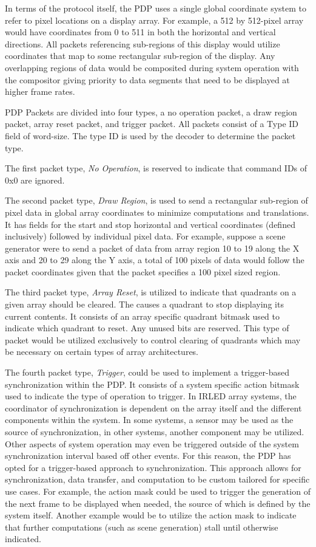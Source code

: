     In terms of the protocol itself, the PDP uses a single global coordinate system to refer to pixel locations on a display array. For example, a 512 by 512-pixel array would have coordinates from 0 to 511 in both the horizontal and vertical directions. All packets referencing sub-regions of this display would utilize coordinates that map to some rectangular sub-region of the display. Any overlapping regions of data would be composited during system operation with the compositor giving priority to data segments that need to be displayed at higher frame rates.

    PDP Packets are divided into four types, a no operation packet, a draw region packet, array reset packet, and trigger packet. All packets consist of a Type ID field of word-size. The type ID is used by the decoder to determine the packet type.

    The first packet type, {\it No Operation}, is reserved to indicate that command IDs of 0x0 are ignored.

    The second packet type, {\it Draw Region}, is used to send a rectangular sub-region of pixel data in global array coordinates to minimize computations and translations. It has fields for the start and stop horizontal and vertical coordinates (defined inclusively) followed by individual pixel data. For example, suppose a scene generator were to send a packet of data from array region 10 to 19 along the X axis and 20 to 29 along the Y axis, a total of 100 pixels of data would follow the packet coordinates given that the packet specifies a 100 pixel sized region.

    The third packet type, {\it Array Reset}, is utilized to indicate that quadrants on a given array should be cleared. The causes a quadrant to stop displaying its current contents. It consists of an array specific quadrant bitmask used to indicate which quadrant to reset. Any unused bits are reserved. This type of packet would be utilized exclusively to control clearing of quadrants which may be necessary on certain types of array architectures.

    The fourth packet type, {\it Trigger}, could be used to implement a trigger-based synchronization within the PDP. It consists of a system specific action bitmask used to indicate the type of operation to trigger. In IRLED array systems, the coordinator of synchronization is dependent on the array itself and the different components within the system. In some systems, a sensor may be used as the source of synchronization, in other systems, another component may be utilized. Other aspects of system operation may even be triggered outside of the system synchronization interval based off other events. For this reason, the PDP has opted for a trigger-based approach to synchronization. This approach allows for synchronization, data transfer, and computation to be custom tailored for specific use cases. For example, the action mask could be used to trigger the generation of the next frame to be displayed when needed, the source of which is defined by the system itself. Another example would be to utilize the action mask to indicate that further computations (such as scene generation) stall until otherwise indicated.

